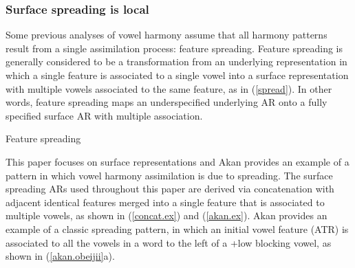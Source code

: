 \documentclass[,doc,floatsintext]{apa6}
\theoremstyle{definition}
\theoremstyle{definition}
\theoremstyle{definition}
\theoremstyle{remark}
\begin{document}
\subsubsection{Surface spreading is
local}\label{surface-spreading-is-local}

Some previous analyses of vowel harmony assume that all harmony patterns
result from a single assimilation process: feature spreading. Feature
spreading is generally considered to be a transformation from an
underlying representation in which a single feature is associated to a
single vowel into a surface representation with multiple vowels
associated to the same feature, as in (\ref{spread}). In other words,
feature spreading maps an underspecified underlying AR onto a fully
specified surface AR with multiple association.

\begin{exe}
\ex Feature spreading \label{spread} \\
\end{exe}

This paper focuses on surface representations and Akan provides an
example of a pattern in which vowel harmony assimilation is due to
spreading. The surface spreading ARs used throughout this paper are
derived via concatenation with adjacent identical features merged into a
single feature that is associated to multiple vowels, as shown in
(\ref{concat.ex}) and (\ref{akan.ex}). Akan provides an example of a
classic spreading pattern, in which an initial vowel feature (ATR) is
associated to all the vowels in a word to the left of a +low blocking
vowel, as shown in (\ref{akan.obeijii}a).
\end{document}
